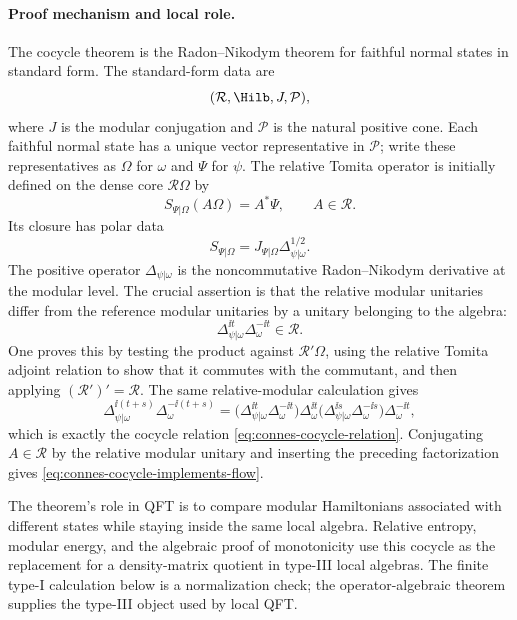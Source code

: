 \paragraph{Proof mechanism and local role.}
The cocycle theorem is the Radon--Nikodym theorem for faithful normal states
in standard form.  The standard-form data are
\[
  (\mathcal R,\Hilb,J,\mathcal P),
\]
where \(J\) is the modular conjugation and \(\mathcal P\) is the natural
positive cone.  Each faithful normal state has a unique vector representative
in \(\mathcal P\); write these representatives as \(\Omega\) for \(\omega\)
and \(\Psi\) for \(\psi\).  The relative Tomita operator is initially defined
on the dense core \(\mathcal R\Omega\) by
\[
  S_{\Psi|\Omega}(A\Omega)=A^*\Psi,\qquad A\in\mathcal R .
\]
Its closure has polar data
\[
  S_{\Psi|\Omega}=J_{\Psi|\Omega}\Delta_{\psi|\omega}^{1/2}.
\]
The positive operator \(\Delta_{\psi|\omega}\) is the noncommutative
Radon--Nikodym derivative at the modular level.  The crucial assertion is that
the relative modular unitaries differ from the reference modular unitaries by
a unitary belonging to the algebra:
\[
  \Delta_{\psi|\omega}^{\ii t}\Delta_\omega^{-\ii t}\in\mathcal R .
\]
One proves this by testing the product against \(\mathcal R'\Omega\), using
the relative Tomita adjoint relation to show that it commutes with the
commutant, and then applying \((\mathcal R')'=\mathcal R\).  The same
relative-modular calculation gives
\[
  \Delta_{\psi|\omega}^{\ii(t+s)}\Delta_\omega^{-\ii(t+s)}
  =
  \bigl(\Delta_{\psi|\omega}^{\ii t}\Delta_\omega^{-\ii t}\bigr)
  \Delta_\omega^{\ii t}
  \bigl(\Delta_{\psi|\omega}^{\ii s}\Delta_\omega^{-\ii s}\bigr)
  \Delta_\omega^{-\ii t},
\]
which is exactly the cocycle relation
\eqref{eq:connes-cocycle-relation}.  Conjugating \(A\in\mathcal R\) by the
relative modular unitary and inserting the preceding factorization gives
\eqref{eq:connes-cocycle-implements-flow}.

The theorem's role in QFT is to compare modular Hamiltonians associated with
different states while staying inside the same local algebra.  Relative
entropy, modular energy, and the algebraic proof of monotonicity use this
cocycle as the replacement for a density-matrix quotient in type-III local
algebras.  The finite type-I calculation below is a normalization check; the
operator-algebraic theorem supplies the type-III object used by local QFT.

